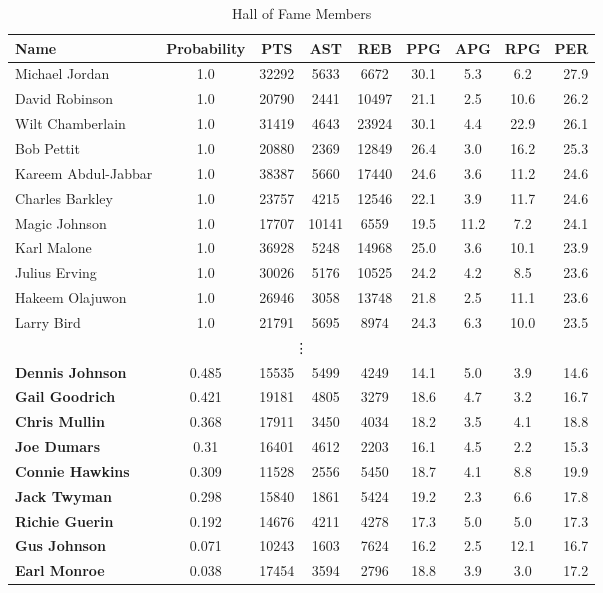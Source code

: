 \documentclass[paper=a4, fontsize=11pt]{scrartcl} %
\numberwithin{equation}{section} %
\numberwithin{figure}{section} %
\numberwithin{table}{section} %
\begin{document}
\begin{table}[thb]
\centering
\caption{\label{hall_of_fame}Hall of Fame Members}
\begin{tabular}{l*{7}{c}r}
Name              & Probability & PTS & AST & REB & PPG  & APG & RPG & PER \\
\hline
Michael Jordan & 1.0 & 32292 & 5633 & 6672 & 30.1 & 5.3 & 6.2 & 27.9 \\
David Robinson & 1.0 & 20790 & 2441 & 10497 & 21.1 & 2.5 & 10.6 & 26.2 \\
Wilt Chamberlain & 1.0 & 31419 & 4643 & 23924 & 30.1 & 4.4 & 22.9 & 26.1 \\
Bob Pettit & 1.0 & 20880 & 2369 & 12849 & 26.4 & 3.0 & 16.2 & 25.3 \\
Kareem Abdul-Jabbar & 1.0 & 38387 & 5660 & 17440 & 24.6 & 3.6 & 11.2 & 24.6 \\
Charles Barkley & 1.0 & 23757 & 4215 & 12546 & 22.1 & 3.9 & 11.7 & 24.6 \\
Magic Johnson & 1.0 & 17707 & 10141 & 6559 & 19.5 & 11.2 & 7.2 & 24.1 \\
Karl Malone & 1.0 & 36928 & 5248 & 14968 & 25.0 & 3.6 & 10.1 & 23.9 \\
Julius Erving & 1.0 & 30026 & 5176 & 10525 & 24.2 & 4.2 & 8.5 & 23.6 \\
Hakeem Olajuwon & 1.0 & 26946 & 3058 & 13748 & 21.8 & 2.5 & 11.1 & 23.6 \\
Larry Bird & 1.0 & 21791 & 5695 & 8974 & 24.3 & 6.3 & 10.0 & 23.5 \\
\multicolumn{9}{c}{\vdots}\\
\textbf{Dennis Johnson} & 0.485 & 15535 & 5499 & 4249 & 14.1 & 5.0 & 3.9 & 14.6 \\
\textbf{Gail Goodrich} & 0.421 & 19181 & 4805 & 3279 & 18.6 & 4.7 & 3.2 & 16.7 \\
\textbf{Chris Mullin} & 0.368 & 17911 & 3450 & 4034 & 18.2 & 3.5 & 4.1 & 18.8 \\
\textbf{Joe Dumars} & 0.31 & 16401 & 4612 & 2203 & 16.1 & 4.5 & 2.2 & 15.3 \\
\textbf{Connie Hawkins} & 0.309 & 11528 & 2556 & 5450 & 18.7 & 4.1 & 8.8 & 19.9 \\
\textbf{Jack Twyman} & 0.298 & 15840 & 1861 & 5424 & 19.2 & 2.3 & 6.6 & 17.8 \\
\textbf{Richie Guerin} & 0.192 & 14676 & 4211 & 4278 & 17.3 & 5.0 & 5.0 & 17.3 \\
\textbf{Gus Johnson} & 0.071 & 10243 & 1603 & 7624 & 16.2 & 2.5 & 12.1 & 16.7 \\
\textbf{Earl Monroe} & 0.038 & 17454 & 3594 & 2796 & 18.8 & 3.9 & 3.0 & 17.2 \\

\end{tabular}
\end{table}
\end{document}
